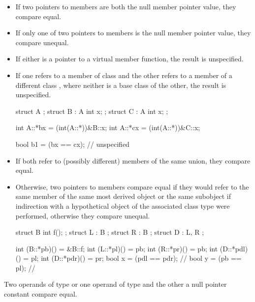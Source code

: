 \begin{itemize}
\item
If two pointers to members are both the null member pointer value, they compare
equal.

\item
If only one of two pointers to members is the null member pointer value, they
compare unequal.

\item
If either is a pointer to a virtual member function, the result is unspecified.

\item
If one refers to a member of class  and the other refers to a member
of a different class , where neither is a base class of the other,
the result is unspecified.
\begin{example}
\begin{codeblock}
struct A {};
struct B : A { int x; };
struct C : A { int x; };

int A::*bx = (int(A::*))&B::x;
int A::*cx = (int(A::*))&C::x;

bool b1 = (bx == cx);   // unspecified
\end{codeblock}
\end{example}

\item
If both refer to (possibly different) members of the same union,
they compare equal.

\item
Otherwise, two pointers to members compare equal if they would refer to the same member of
the same most derived object or the same subobject if
indirection with a hypothetical object of the associated
class type were performed, otherwise they compare unequal.
\begin{example}

\begin{codeblock}
struct B {
  int f();
};
struct L : B { };
struct R : B { };
struct D : L, R { };

int (B::*pb)() = &B::f;
int (L::*pl)() = pb;
int (R::*pr)() = pb;
int (D::*pdl)() = pl;
int (D::*pdr)() = pr;
bool x = (pdl == pdr);          // 
bool y = (pb == pl);            // 
\end{codeblock}
\end{example}
\end{itemize}

\pnum
Two operands of type  or one operand of type
 and the other a null pointer constant compare equal.

